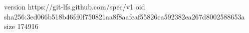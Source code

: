 version https://git-lfs.github.com/spec/v1
oid sha256:3ed066b518b46fd0f750821aa8f8aafcaf55826ca592382ea267d8002588653a
size 174916
